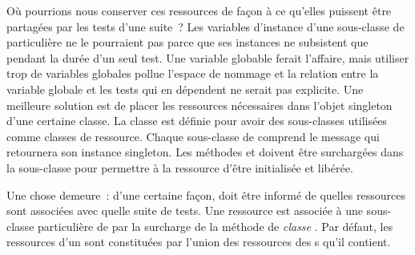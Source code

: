 \documentclass[a4paper,10pt,twoside]{book}
\begin{document}
Où pourrions nous conserver ces ressources de façon à ce qu'elles puissent être partagées par les tests d'une suite~?
Les variables d'instance d'une sous-classe de  particulière ne le pourraient pas parce que ses instances ne subsistent que pendant la durée d'un seul test.
Une variable globable ferait l'affaire, mais utiliser trop de variables globales pollue l'espace de nommage et la relation entre la variable globale et les tests qui en dépendent ne serait pas explicite.
Une meilleure solution est de placer les ressources nécessaires dans l'objet singleton d'une certaine classe. La classe  est définie pour avoir des sous-classes utilisées comme classes de ressource. Chaque sous-classe de  comprend le message  qui retournera son instance singleton.
Les méthodes   et  doivent être surchargées dans la sous-classe pour permettre à la ressource d'être initialisée et libérée.

Une chose demeure~: d'une certaine façon, \sunit doit être informé de quelles ressources sont associées avec quelle suite de tests. Une ressource est associée à une sous-classe particulière de  par la surcharge de la méthode de \emph{classe} .
Par défaut, les ressources d'un  sont constituées par l'union des ressources des s qu'il contient.

\end{document}
